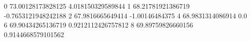 0 73.00128173828125 4.018150329589844
1 68.21781921386719 -0.7653121948242188
2 67.9816665649414 -1.00146484375
4 68.9831314086914 0.0
6 69.90434265136719 0.9212112426757812
8 69.89759826660156 0.9144668579101562
